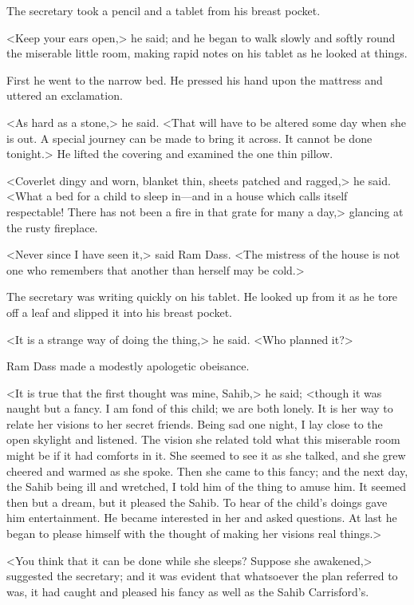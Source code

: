The secretary took a pencil and a tablet from his breast pocket.

<Keep your ears open,> he said; and he began to walk slowly and softly round the miserable little room, making rapid notes on his tablet as he looked at things.

First he went to the narrow bed. He pressed his hand upon the mattress and uttered an exclamation.

<As hard as a stone,> he said. <That will have to be altered some day when she is out. A special journey can be made to bring it across. It cannot be done tonight.> He lifted the covering and examined the one thin pillow.

<Coverlet dingy and worn, blanket thin, sheets patched and ragged,> he said. <What a bed for a child to sleep in—and in a house which calls itself respectable! There has not been a fire in that grate for many a day,> glancing at the rusty fireplace.

<Never since I have seen it,> said Ram Dass. <The mistress of the house is not one who remembers that another than herself may be cold.>

The secretary was writing quickly on his tablet. He looked up from it as he tore off a leaf and slipped it into his breast pocket.

<It is a strange way of doing the thing,> he said. <Who planned it?>

Ram Dass made a modestly apologetic obeisance.

<It is true that the first thought was mine, Sahib,> he said; <though it was naught but a fancy. I am fond of this child; we are both lonely. It is her way to relate her visions to her secret friends. Being sad one night, I lay close to the open skylight and listened. The vision she related told what this miserable room might be if it had comforts in it. She seemed to see it as she talked, and she grew cheered and warmed as she spoke. Then she came to this fancy; and the next day, the Sahib being ill and wretched, I told him of the thing to amuse him. It seemed then but a dream, but it pleased the Sahib. To hear of the child's doings gave him entertainment. He became interested in her and asked questions. At last he began to please himself with the thought of making her visions real things.>

<You think that it can be done while she sleeps? Suppose she awakened,> suggested the secretary; and it was evident that whatsoever the plan referred to was, it had caught and pleased his fancy as well as the Sahib Carrisford's.

